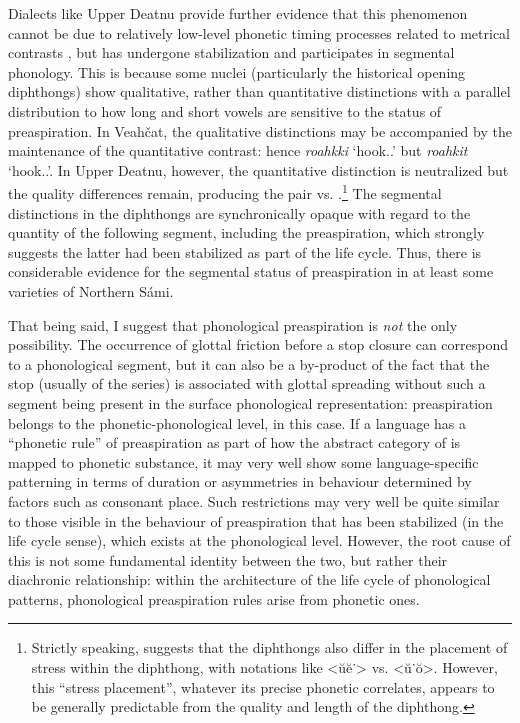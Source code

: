 \documentclass[output=paper,colorlinks,citecolor=brown]{langscibook}
\begin{document}
\largerpage
Dialects like Upper Deatnu provide further evidence that this phenomenon cannot be due to relatively low\hyp level phonetic timing processes related to metrical contrasts \parencite[cf.][]{hiovain2020dialectal}, but has undergone stabilization and participates in segmental phonology. This is because some nuclei (particularly the historical opening diphthongs) show qualitative, rather than quantitative distinctions with a parallel distribution to how long and short vowels are sensitive to the status of preaspiration. In Veahčat, the qualitative distinctions may be accompanied by the maintenance of the quantitative contrast: hence \ipa{[rŏ͜æ̆hkiː]} \textit{roahkki} `hook.\Nom.\Sg' but \ipa{[ru͜æhkiːh]} \textit{roahkit} `hook.\Nom.\Pl'. In Upper Deatnu, however, the quantitative distinction is neutralized but the quality differences remain, producing the pair \ipa{[rŏ͜æ̆hkiː]} vs. \ipa{[rŭ͜ŏhkiːh]}  \parencite[65]{sammallahti2019láidehus}.\footnote{Strictly speaking, \textcite{sammallahti2019láidehus} suggests that the diphthongs also differ in the placement of stress within the diphthong, with notations like <ŭĕ˙> vs. <ŭ˙ŏ>. However, this \enquote{stress placement}, whatever its precise phonetic correlates, appears to be generally predictable from the quality and length of the diphthong.} The segmental distinctions in the diphthongs are synchronically opaque with regard to the quantity of the following segment, including the preaspiration, which strongly suggests the latter had been stabilized as part of the life cycle. Thus, there is considerable evidence for the segmental status of preaspiration in at least some varieties of Northern Sámi.

That being said, I suggest that phonological preaspiration is \emph{not} the only possibility. The occurrence of glottal friction before a stop closure can correspond to a phonological \ipa{[h]} segment, but it can also be a by\hyp product of the fact that the stop (usually of the {\VOICELESS} series) is associated with glottal spreading without such a segment being present in the surface phonological representation: preaspiration belongs to the phonetic-phonological level, in this case. If a language has a \enquote{phonetic rule} of preaspiration as part of how the abstract category of {\VOICELESS} is mapped to phonetic substance, it may very well show some language\hyp specific patterning in terms of duration or asymmetries in behaviour determined by factors such as consonant place. Such restrictions may very well be quite similar to those visible in the behaviour of preaspiration that has been stabilized (in the life cycle sense), which exists at the phonological level. However, the root cause of this is not some fundamental identity between the two, but rather their diachronic relationship: within the architecture of the life cycle of phonological patterns, phonological preaspiration rules arise from phonetic ones.
\end{document}

